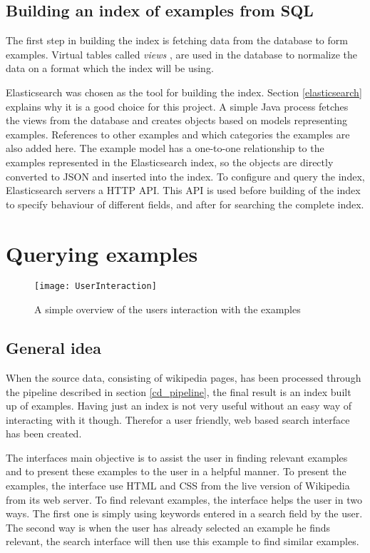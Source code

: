 \subsection{Building an index of examples from SQL}
The first step in building the index is fetching data from the database to form examples. Virtual tables called \textit{views}%
, are used in the database to normalize%
 the data on a format which the index will be using.

Elasticsearch was chosen as the tool for building the index. Section \ref{elasticsearch} explains why it is a good choice for this project. A simple Java process fetches the views from the database and creates objects based on models representing examples. References to other examples and which categories the examples are also added here. The example model has a one-to-one relationship to the examples represented in the Elasticsearch index, so the objects are directly converted to JSON and inserted into the index. To configure and query the index, Elasticsearch servers a HTTP API. This API is used before building of the index to specify behaviour of different fields, and after for searching the complete index.


\section{Querying examples}

\begin{figure}[h]
\caption{A simple overview of the users interaction with the examples}
\texttt{[image: UserInteraction]}
\end{figure}

\subsection{General idea}
When the source data, consisting of wikipedia pages, has been processed through the pipeline described in section \ref{cd_pipeline}, the final result is an index built up of examples. Having just an index is not very useful without an easy way of interacting with it though. Therefor a user friendly, web based search interface has been created. 

The interfaces main objective is to assist the user in finding relevant examples and to present these examples to the user in a helpful manner. To present the examples, the interface use HTML and CSS from the live version of Wikipedia from its web server. To find relevant examples, the interface helps the user in two ways. The first one is simply using keywords entered in a search field by the user. The second way is when the user has already selected an example he finds relevant, the search interface will then use this example to find similar examples.

